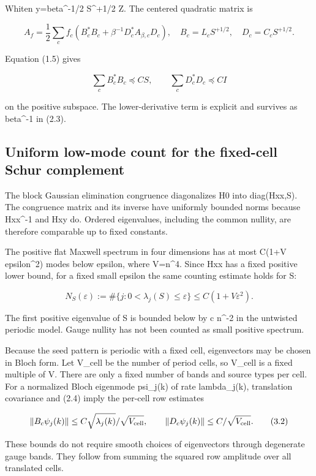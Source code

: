 \documentclass[
  11pt,
]{article}
\begin{document}
Whiten y=beta\^{}-1/2 S\^{}+1/2 Z. The centered quadratic matrix is

\[
 A_f=\frac12\sum_cf_c\left(
 B_c^*B_c+\beta^{-1}D_c^*A_{\beta,c}D_c\right),
 \quad B_c=L_cS^{+1/2},\quad D_c=C_cS^{+1/2}.
\tag{2.3}
\]

Equation (1.5) gives

\[
 \sum_cB_c^*B_c\preceq CS,
 \qquad \sum_cD_c^*D_c\preceq CI
\tag{2.4}
\]

on the positive subspace. The lower-derivative term is explicit and
survives as beta\^{}-1 in (2.3).

\hypertarget{uniform-low-mode-count-for-the-fixed-cell-schur-complement}{%
\subsection{Uniform low-mode count for the fixed-cell Schur
complement}\label{uniform-low-mode-count-for-the-fixed-cell-schur-complement}}

The block Gaussian elimination congruence diagonalizes H0 into
diag(Hxx,S). The congruence matrix and its inverse have uniformly
bounded norms because Hxx\^{}-1 and Hxy do. Ordered eigenvalues,
including the common nullity, are therefore comparable up to fixed
constants.

The positive flat Maxwell spectrum in four dimensions has at most C(1+V
epsilon\^{}2) modes below epsilon, where V=n\^{}4. Since Hxx has a fixed
positive lower bound, for a fixed small epsilon the same counting
estimate holds for S:

\[
 N_S(\varepsilon)
 :=\#\{j:0<\lambda_j(S)\le\varepsilon\}
 \le C(1+V\varepsilon^2).
\tag{3.1}
\]

The first positive eigenvalue of S is bounded below by c n\^{}-2 in the
untwisted periodic model. Gauge nullity has not been counted as small
positive spectrum.

Because the seed pattern is periodic with a fixed cell, eigenvectors may
be chosen in Bloch form. Let V\_cell be the number of period cells, so
V\_cell is a fixed multiple of V. There are only a fixed number of bands
and source types per cell. For a normalized Bloch eigenmode psi\_j(k) of
rate lambda\_j(k), translation covariance and (2.4) imply the per-cell
row estimates

\[
 \|B_c\psi_j(k)\|\le C\sqrt{\lambda_j(k)}/\sqrt{V_{\rm cell}},
 \qquad
 \|D_c\psi_j(k)\|\le C/\sqrt{V_{\rm cell}}.
\tag{3.2}
\]

These bounds do not require smooth choices of eigenvectors through
degenerate gauge bands. They follow from summing the squared row
amplitude over all translated cells.
\end{document}
